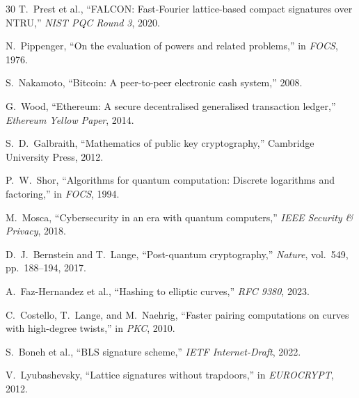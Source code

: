 \begin{thebibliography}{30}
T.~Prest et al., ``FALCON: Fast-Fourier lattice-based compact signatures over NTRU,'' \emph{NIST PQC Round 3}, 2020.

N.~Pippenger, ``On the evaluation of powers and related problems,'' in \emph{FOCS}, 1976.

S.~Nakamoto, ``Bitcoin: A peer-to-peer electronic cash system,'' 2008.

G.~Wood, ``Ethereum: A secure decentralised generalised transaction ledger,'' \emph{Ethereum Yellow Paper}, 2014.

S.~D.~Galbraith, ``Mathematics of public key cryptography,'' Cambridge University Press, 2012.

P.~W.~Shor, ``Algorithms for quantum computation: Discrete logarithms and factoring,'' in \emph{FOCS}, 1994.

M.~Mosca, ``Cybersecurity in an era with quantum computers,'' \emph{IEEE Security \& Privacy}, 2018.

D.~J.~Bernstein and T.~Lange, ``Post-quantum cryptography,'' \emph{Nature}, vol.~549, pp.~188--194, 2017.

A.~Faz-Hernandez et al., ``Hashing to elliptic curves,'' \emph{RFC 9380}, 2023.

C.~Costello, T.~Lange, and M.~Naehrig, ``Faster pairing computations on curves with high-degree twists,'' in \emph{PKC}, 2010.

S.~Boneh et al., ``BLS signature scheme,'' \emph{IETF Internet-Draft}, 2022.

V.~Lyubashevsky, ``Lattice signatures without trapdoors,'' in \emph{EUROCRYPT}, 2012.

\end{thebibliography}

